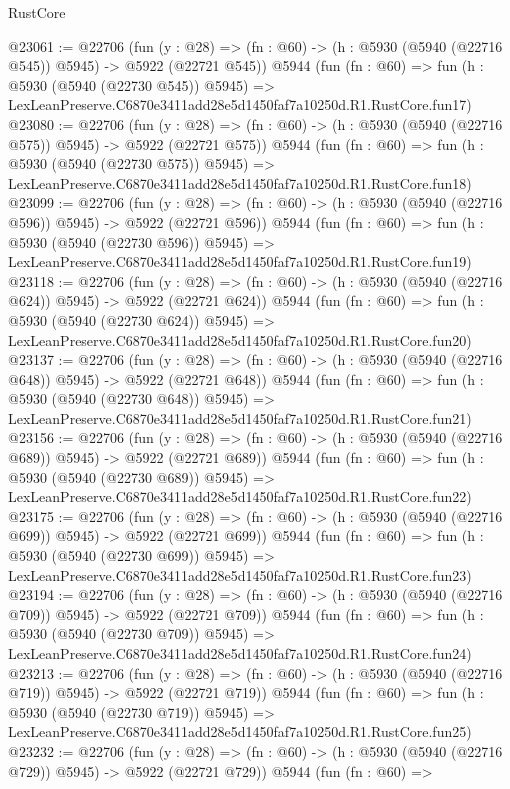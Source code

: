 \begin{lexlean}{RustCore}
\begin{coremodule}
@23061 := @22706
    (fun (y : @28) => (fn : @60) -> (h : @5930 (@5940 (@22716 @545)) @5945) -> @5922 (@22721 @545))
    @5944
    (fun (fn : @60) =>
    fun (h : @5930 (@5940 (@22730 @545)) @5945) =>
    LexLeanPreserve.C6870e3411add28e5d1450faf7a10250d.R1.RustCore.fun17)
@23080 := @22706
    (fun (y : @28) => (fn : @60) -> (h : @5930 (@5940 (@22716 @575)) @5945) -> @5922 (@22721 @575))
    @5944
    (fun (fn : @60) =>
    fun (h : @5930 (@5940 (@22730 @575)) @5945) =>
    LexLeanPreserve.C6870e3411add28e5d1450faf7a10250d.R1.RustCore.fun18)
@23099 := @22706
    (fun (y : @28) => (fn : @60) -> (h : @5930 (@5940 (@22716 @596)) @5945) -> @5922 (@22721 @596))
    @5944
    (fun (fn : @60) =>
    fun (h : @5930 (@5940 (@22730 @596)) @5945) =>
    LexLeanPreserve.C6870e3411add28e5d1450faf7a10250d.R1.RustCore.fun19)
@23118 := @22706
    (fun (y : @28) => (fn : @60) -> (h : @5930 (@5940 (@22716 @624)) @5945) -> @5922 (@22721 @624))
    @5944
    (fun (fn : @60) =>
    fun (h : @5930 (@5940 (@22730 @624)) @5945) =>
    LexLeanPreserve.C6870e3411add28e5d1450faf7a10250d.R1.RustCore.fun20)
@23137 := @22706
    (fun (y : @28) => (fn : @60) -> (h : @5930 (@5940 (@22716 @648)) @5945) -> @5922 (@22721 @648))
    @5944
    (fun (fn : @60) =>
    fun (h : @5930 (@5940 (@22730 @648)) @5945) =>
    LexLeanPreserve.C6870e3411add28e5d1450faf7a10250d.R1.RustCore.fun21)
@23156 := @22706
    (fun (y : @28) => (fn : @60) -> (h : @5930 (@5940 (@22716 @689)) @5945) -> @5922 (@22721 @689))
    @5944
    (fun (fn : @60) =>
    fun (h : @5930 (@5940 (@22730 @689)) @5945) =>
    LexLeanPreserve.C6870e3411add28e5d1450faf7a10250d.R1.RustCore.fun22)
@23175 := @22706
    (fun (y : @28) => (fn : @60) -> (h : @5930 (@5940 (@22716 @699)) @5945) -> @5922 (@22721 @699))
    @5944
    (fun (fn : @60) =>
    fun (h : @5930 (@5940 (@22730 @699)) @5945) =>
    LexLeanPreserve.C6870e3411add28e5d1450faf7a10250d.R1.RustCore.fun23)
@23194 := @22706
    (fun (y : @28) => (fn : @60) -> (h : @5930 (@5940 (@22716 @709)) @5945) -> @5922 (@22721 @709))
    @5944
    (fun (fn : @60) =>
    fun (h : @5930 (@5940 (@22730 @709)) @5945) =>
    LexLeanPreserve.C6870e3411add28e5d1450faf7a10250d.R1.RustCore.fun24)
@23213 := @22706
    (fun (y : @28) => (fn : @60) -> (h : @5930 (@5940 (@22716 @719)) @5945) -> @5922 (@22721 @719))
    @5944
    (fun (fn : @60) =>
    fun (h : @5930 (@5940 (@22730 @719)) @5945) =>
    LexLeanPreserve.C6870e3411add28e5d1450faf7a10250d.R1.RustCore.fun25)
@23232 := @22706
    (fun (y : @28) => (fn : @60) -> (h : @5930 (@5940 (@22716 @729)) @5945) -> @5922 (@22721 @729))
    @5944
    (fun (fn : @60) =>

\end{coremodule}
\end{lexlean}
